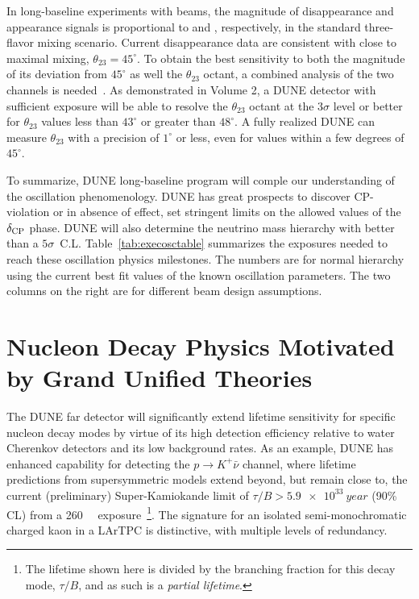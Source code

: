 In long-baseline experiments with \numu beams, the
magnitude of \numu disappearance and \nue appearance signals is
proportional to  and ,
respectively, in the standard three-flavor mixing scenario.  Current
\numu disappearance data are consistent with close to maximal
mixing, $\theta_{23} = 45^\circ$.  To obtain the best sensitivity to
both the magnitude of its deviation from $45^\circ$ as well the 
$\theta_{23}$ octant, a combined analysis of the two channels
is needed~\cite{Huber:2010dx}.  As demonstrated in Volume 2, a
 DUNE detector with sufficient exposure will be able to
resolve the $\theta_{23}$ octant at the $3\sigma$ level or better for
$\theta_{23}$ values less than $43^\circ$ or greater than $48^\circ$.
A fully realized DUNE can measure $\theta_{23}$ with a precision of
$1^\circ$ or less, even for values within a few degrees of
$45^\circ$. 

To summarize, DUNE long-baseline program will comple
our understanding of the oscillation phenomenology. 
DUNE has great prospects to discover CP-violation or in absence of
effect, set stringent limits on the allowed values of the $\delta_{\rm CP}$
phase. DUNE will also determine the neutrino mass hierarchy with better
than a $5\sigma$~C.L.
Table~\ref{tab:execosctable} summarizes the exposures
needed to reach these oscillation physics
 milestones. The numbers are for normal hierarchy using the current best fit values of the known oscillation parameters. The two columns
    on the right are for different beam design assumptions. 



\section{Nucleon Decay Physics Motivated by Grand Unified Theories}


The DUNE far detector will significantly extend lifetime sensitivity
for specific nucleon decay modes by virtue of its high detection
efficiency relative to water Cherenkov detectors and its low
background rates.  As an example, DUNE has enhanced capability for
detecting the $p\to K^+\bar{\nu}$ channel, where lifetime
predictions from supersymmetric models extend beyond, but remain close
to, the current (preliminary) Super-Kamiokande limit of $\tau/B >
\SI{5.9e33}{year}$ (90\% CL) from a \SI[number-unit-product = -,
inter-unit-product=\ensuremath{{}\cdot{}}]{260}{\kt\year}
exposure~\cite{kearns_isoups}\footnote{The lifetime shown here is
  divided by the branching fraction for this decay mode, $\tau/B$, and
  as such is a \emph{partial lifetime}.}.  The signature for an
isolated semi-monochromatic charged kaon in a LArTPC is distinctive,
with multiple levels of redundancy. 

